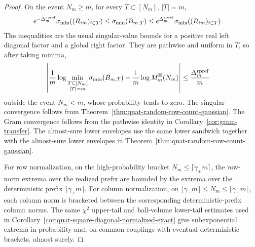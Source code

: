 \begin{proof}
On the event \(N_m\ge m\), for every \(T\subset[N_m]\), \(|T|=m\),
\[
  e^{-\Delta_m^{\rm rpref}}\sigma_{\min}((R_{im})_{i\in T})
  \le
  \sigma_{\min}(B_{m,T})
  \le
  e^{\Delta_m^{\rm rpref}}\sigma_{\min}((R_{im})_{i\in T}).
\]
The inequalities are the usual singular-value bounds for a positive real left
diagonal factor and a global right factor.  They are pathwise and uniform in
\(T\), so after taking minima,
\[
  \left|
  \frac1m\log
  \min_{\substack{T\subset[N_m]\\ |T|=m}}\sigma_{\min}(B_{m,T})
  -
  \frac1m\log M_m^{\mathbb{H}}(N_m)
  \right|
  \le \frac{\Delta_m^{\rm rpref}}m
\]
outside the event \(N_m<m\), whose probability tends to zero.  The singular
convergence follows from
Theorem~\ref{thm:quat-random-row-count-gaussian}.  The Gram convergence follows
from the pathwise identity in Corollary~\ref{cor:gram-transfer}.  The
almost-sure lower envelopes use the same lower sandwich together with the
almost-sure lower envelopes in Theorem~\ref{thm:quat-random-row-count-gaussian}.

For row normalization, on the high-probability bracket
\(N_m\le\lceil\gamma_+m\rceil\), the row-norm extrema over the realized prefix
are bounded by the extrema over the deterministic prefix
\(\lceil\gamma_+m\rceil\).  For column normalization, on
\(\lfloor\gamma_-m\rfloor\le N_m\le\lceil\gamma_+m\rceil\), each column norm is
bracketed between the corresponding deterministic-prefix column norms.  The
same \(\chi^2\) upper-tail and ball-volume lower-tail estimates used in
Corollary~\ref{cor:quat-square-diagonal-normalized-exact} give
subexponential extrema in probability and, on common couplings with eventual
deterministic brackets, almost surely.
\end{proof}

